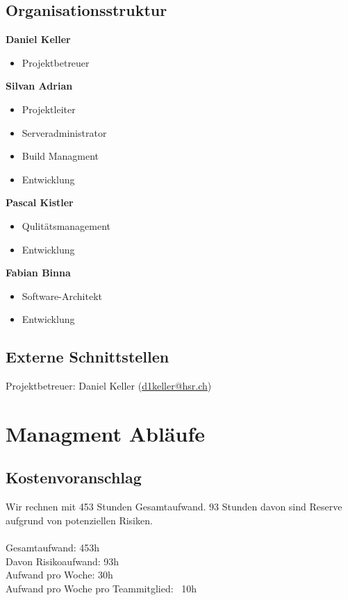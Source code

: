 \documentclass[11pt]{scrartcl}
\begin{document}
\subsection{Organisationsstruktur}
\label{sec:Organisationsstruktur}
\textbf{Daniel Keller}
\begin{itemize}
    \item Projektbetreuer
\end{itemize}
\textbf{Silvan Adrian}
\begin{itemize}
    \item Projektleiter
    \item Serveradministrator
    \item Build Managment
    \item Entwicklung
\end{itemize}
\textbf{Pascal Kistler}
\begin{itemize}
    \item Qulitätsmanagement
    \item Entwicklung
\end{itemize}
\textbf{Fabian Binna}
\begin{itemize}
    \item Software-Architekt
    \item Entwicklung
\end{itemize}

\subsection{Externe Schnittstellen}
\label{sec:Externe Schnittstellen}
Projektbetreuer: Daniel Keller (\href{mailto:d1keller@hsr.ch}{d1keller@hsr.ch})

\section{Managment Abläufe}
\label{sec:Managment Abläufe}
\subsection{Kostenvoranschlag}
\label{sec:Kostenvoranschlag}
Wir rechnen mit 453 Stunden Gesamtaufwand. 93 Stunden davon sind Reserve aufgrund von potenziellen Risiken.\\
\\
Gesamtaufwand: 453h \\
Davon Risikoaufwand: 93h \\
Aufwand pro Woche: 30h \\
Aufwand pro Woche pro Teammitglied: ~10h \\
\end{document}

